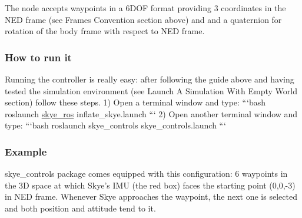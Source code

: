{\ttfamily The node accepts waypoints in a 6\-D\-O\-F format providing 3 coordinates in the N\-E\-D frame (see Frames Convention section above) and and a quaternion for rotation of the body frame with respect to N\-E\-D frame.}

{\ttfamily \subsubsection*{How to run it}}

{\ttfamily  Running the controller is really easy\-: after following the guide above and having tested the simulation environment (see Launch A Simulation With Empty World section) follow these steps. 1) Open a terminal window and type\-: ```bash roslaunch \hyperlink{namespaceskye__ros}{skye\-\_\-ros} inflate\-\_\-skye.\-launch ``` 2) Open another terminal window and type\-: ```bash roslaunch skye\-\_\-controls skye\-\_\-controls.\-launch ```}

{\ttfamily \subsubsection*{Example}}

{\ttfamily  skye\-\_\-controls package comes equipped with this configuration\-: 6 waypoints in the 3\-D space at which Skye's I\-M\-U (the red box) faces the starting point (0,0,-\/3) in N\-E\-D frame. Whenever Skye approaches the waypoint, the next one is selected and both position and attitude tend to it. }